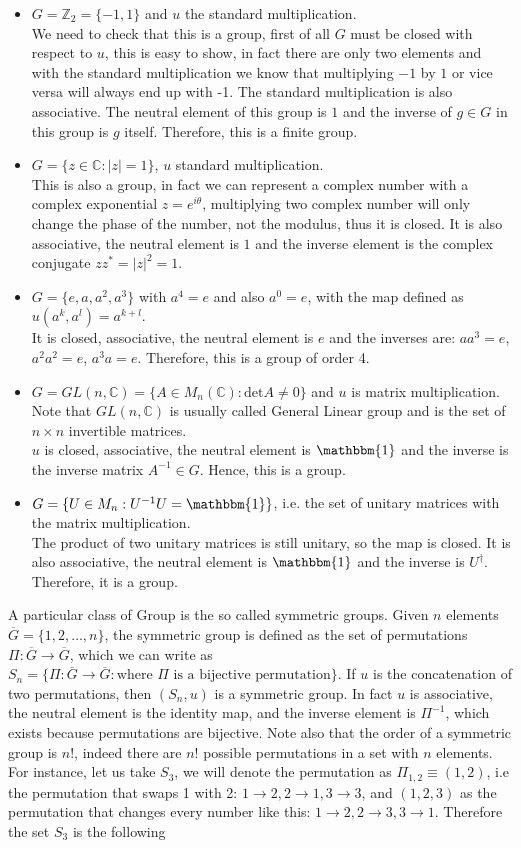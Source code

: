 \documentclass[12pt]{book}
\theoremstyle{plain}
\newcommand{\I}{\mathbbm{1}}
\newcommand{\Z}{\mathbb{Z}}
\newcommand{\C}{\mathbb{C}}
\theoremstyle{definition}
\theoremstyle{remark}
\begin{document}
\begin{itemize}
\item $G = \Z_2 = \{-1,1\}$ and $u$ the standard multiplication.\\
 We need to check that this is a group, first of all $G$ must be closed with respect to $u$, this is easy to show, in fact there are only two elements and with the standard multiplication we know that multiplying $-1$ by $1$ or vice versa will always end up with -1. The standard multiplication is also associative. The neutral element of this group is $1$ and the inverse of $g\in G$ in this group is $g$ itself. Therefore, this is a finite group.
\item $G = \{z\in \C : |z|=1\}$, $u$ standard multiplication.\\
This is also a group, in fact we can represent a complex number with a complex exponential $z=e^{i\theta}$, multiplying two complex number will only change the phase of the number, not the modulus, thus it is closed. It is also associative, the neutral element is $1$ and the inverse element is the complex conjugate $zz^* = |z|^2 = 1$.
\item $G = \{e,a,a^2,a^3\}$ with $a^4=e$ and also $a^0=e$, with the map defined as $u(a^k,a^l) = a^{k+l}$.\\
It is closed, associative, the neutral element is $e$ and the inverses are: $aa^3 = e$, $a^2a^2=e$, $a^3a=e$. Therefore, this is a group of order 4.
\item $G = GL(n,\C) = \{A\in M_n(\C): \text{det}A\neq 0\}$ and $u$ is matrix multiplication. Note that $GL(n,\C)$ is usually called General Linear group and is the set of $n\times n$ invertible matrices.\\
$u$ is closed, associative, the neutral element is $\mathbbm{1}$ and the inverse is the inverse matrix $A^{-1}\in G$. Hence, this is a group.
\item $G = \{U\in M_n : U^{-1}U = \I\}$, i.e. the set of unitary matrices with the matrix multiplication.\\
The product of two unitary matrices is still unitary, so the map is closed. It is also associative, the neutral element is $\I$ and the inverse is $U^\dagger$. Therefore, it is a group.
\end{itemize}
A particular class of Group is the so called symmetric groups. Given $n$ elements $\overline{G}=\{1,2,\dots,n\}$, the symmetric group is defined as the set of permutations $\Pi:\overline{G}\to \overline{G}$, which we can write as $S_n = \{\Pi:\overline{G}\to \overline{G}: \text{where } \Pi \text{ is a bijective permutation}\}$. If $u$ is the concatenation of two permutations, then $(S_n,u)$ is a symmetric group. In fact $u$ is associative, the neutral element is the identity map, and the inverse element is $\Pi^{-1}$, which exists because permutations are bijective. Note also that the order of a symmetric group is $n!$, indeed there are $n!$ possible permutations in a set with $n$ elements. For instance, let us take $S_3$, we will denote the permutation as $\Pi_{1,2}\equiv (1,2)$, i.e the permutation that swaps 1 with 2: $1\to 2,2\to 1,3\to3$, and $(1,2,3)$ as the permutation that changes every number like this: $1\to2,2\to3,3\to1$. Therefore the set $S_3$ is the following
\end{document}
